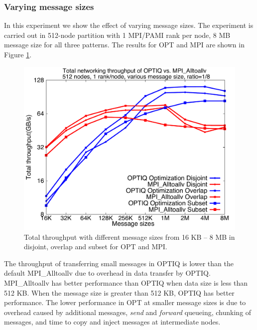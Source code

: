 \subsubsection{Varying message sizes}

In this experiment we show the effect of varying message sizes. The experiment is carried out in 512-node partition with 1 MPI/PAMI rank per node, 8 MB message size for all three patterns. The results for OPT and MPI are shown in Figure \ref{fig:messagesize}.
\begin{figure}[!htb]
\vspace{-0.15in}
\centering
\includegraphics[scale=0.24]{figures/messagesize.pdf}
\vspace{-0.15in}
\caption{\small Total throughput with different message sizes from 16 KB -- 8 MB in disjoint, overlap and subset for OPT and MPI.}
\vspace{-0.15in}
\label{fig:messagesize}
\end{figure}
The throughput of transferring small messages in OPTIQ is lower than the default MPI\_Alltoallv due to overhead in data transfer by OPTIQ. MPI\_Alltoallv has better performance than OPTIQ when data size is less than 512 KB. 
When the message size is greater than 512 KB, OPTIQ has better performance. The lower performance in OPT at smaller message sizes is due to overhead caused by additional messages, {\em send} and {\em forward} queueing, chunking of messages, and time to copy and inject messages at intermediate nodes.
